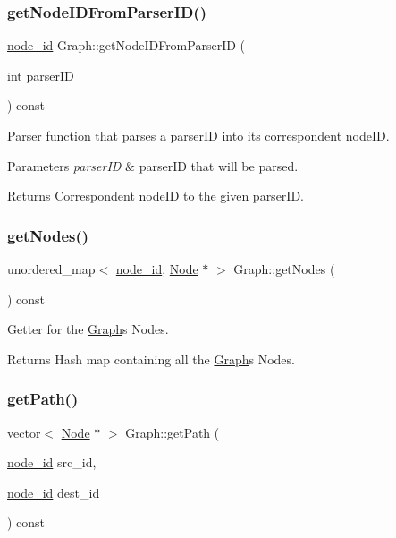 \subsubsection{\texorpdfstring{get\+Node\+I\+D\+From\+Parser\+I\+D()}{getNodeIDFromParserID()}}
{\footnotesize\ttfamily \hyperlink{_node_8hpp_a9d6265804805c2375068fd7484840dc6}{node\+\_\+id} Graph\+::get\+Node\+I\+D\+From\+Parser\+ID (\begin{DoxyParamCaption}\item[{int}]{parser\+ID }\end{DoxyParamCaption}) const}

Parser function that parses a parser\+ID into its correspondent node\+ID.


\begin{DoxyParams}{Parameters}
{\em parser\+ID} & parser\+ID that will be parsed.\\
\hline
\end{DoxyParams}
\begin{DoxyReturn}{Returns}
Correspondent node\+ID to the given parser\+ID. 
\end{DoxyReturn}
\hypertarget{class_graph_aa64f6696d40b6a8e0d92df399ed11310}{}\label{class_graph_aa64f6696d40b6a8e0d92df399ed11310} 
\subsubsection{\texorpdfstring{get\+Nodes()}{getNodes()}}
{\footnotesize\ttfamily unordered\+\_\+map$<$ \hyperlink{_node_8hpp_a9d6265804805c2375068fd7484840dc6}{node\+\_\+id}, \hyperlink{class_node}{Node} $\ast$ $>$ Graph\+::get\+Nodes (\begin{DoxyParamCaption}{ }\end{DoxyParamCaption}) const}

Getter for the \hyperlink{class_graph}{Graph}\textquotesingle{}s Nodes.

\begin{DoxyReturn}{Returns}
Hash map containing all the \hyperlink{class_graph}{Graph}\textquotesingle{}s Nodes. 
\end{DoxyReturn}
\hypertarget{class_graph_ae4c66eaf1b29f53bf90ad6266baa6819}{}\label{class_graph_ae4c66eaf1b29f53bf90ad6266baa6819} 
\subsubsection{\texorpdfstring{get\+Path()}{getPath()}}
{\footnotesize\ttfamily vector$<$ \hyperlink{class_node}{Node} $\ast$ $>$ Graph\+::get\+Path (\begin{DoxyParamCaption}\item[{\hyperlink{_node_8hpp_a9d6265804805c2375068fd7484840dc6}{node\+\_\+id}}]{src\+\_\+id,  }\item[{\hyperlink{_node_8hpp_a9d6265804805c2375068fd7484840dc6}{node\+\_\+id}}]{dest\+\_\+id }\end{DoxyParamCaption}) const}

